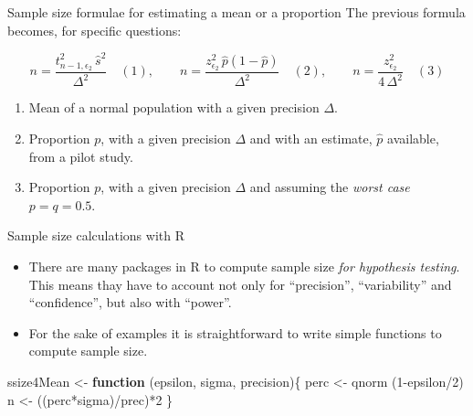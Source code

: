 \documentclass[
  ignorenonframetext,
]{beamer}
\newenvironment{Shaded}{\begin{snugshade}}{\end{snugshade}}
\newcommand{\ControlFlowTok}[1]{\textcolor[rgb]{0.13,0.29,0.53}{\textbf{#1}}}
\newcommand{\DecValTok}[1]{\textcolor[rgb]{0.00,0.00,0.81}{#1}}
\newcommand{\FunctionTok}[1]{\textcolor[rgb]{0.00,0.00,0.00}{#1}}
\newcommand{\NormalTok}[1]{#1}
\newcommand{\OtherTok}[1]{\textcolor[rgb]{0.56,0.35,0.01}{#1}}
\newcommand{\SpecialCharTok}[1]{\textcolor[rgb]{0.00,0.00,0.00}{#1}}
\begin{document}
\begin{frame}{Sample size formulae for estimating a mean or a
proportion}
\protect\hypertarget{sample-size-formulae-for-estimating-a-mean-or-a-proportion}{}
The previous formula becomes, for specific questions:

\[
n= \frac{t_{n-1, \epsilon_2} ^2 \, \hat  s ^2}{\Delta^2} \quad (1), \qquad 
n= \frac{z_{\epsilon_2} ^2 \, \hat  p (1-\hat p)}{\Delta^2} \quad(2), \qquad 
n= \frac{z_{\epsilon_2} ^2 }{4\,\Delta^2} \quad(3) 
\]

\begin{enumerate}
\item
  Mean of a normal population with a given precision \(\Delta\).
\item
  Proportion \(p\), with a given precision \(\Delta\) and with an
  estimate, \(\hat p\) available, from a pilot study.
\item
  Proportion \(p\), with a given precision \(\Delta\) and assuming the
  \emph{worst case} \(p=q=0.5\).
\end{enumerate}
\end{frame}

\begin{frame}[fragile]{Sample size calculations with R}
\protect\hypertarget{sample-size-calculations-with-r}{}
\begin{itemize}
\item
  There are many packages in R to compute sample size \emph{for
  hypothesis testing}. This means thay have to account not only for
  ``precision'', ``variability'' and ``confidence'', but also with
  ``power''.
\item
  For the sake of examples it is straightforward to write simple
  functions to compute sample size.
\end{itemize}

\begin{Shaded}
\begin{Highlighting}[]
\NormalTok{ssize4Mean }\OtherTok{\textless{}{-}} \ControlFlowTok{function}\NormalTok{ (epsilon, sigma, precision)\{}
\NormalTok{  perc }\OtherTok{\textless{}{-}} \FunctionTok{qnorm}\NormalTok{ (}\DecValTok{1}\SpecialCharTok{{-}}\NormalTok{epsilon}\SpecialCharTok{/}\DecValTok{2}\NormalTok{)}
\NormalTok{  n }\OtherTok{\textless{}{-}}\NormalTok{ ((perc}\SpecialCharTok{*}\NormalTok{sigma)}\SpecialCharTok{/}\NormalTok{prec)}\SpecialCharTok{*}\DecValTok{2}
\NormalTok{\}}
\end{Highlighting}
\end{Shaded}
\end{frame}
\end{document}
